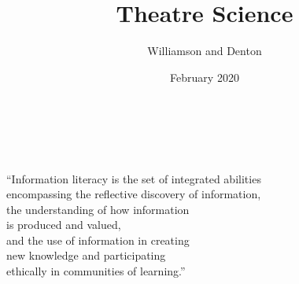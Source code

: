 \documentclass[17pt]{extarticle}
\title{Theatre Science}
\author{Williamson and Denton}
\date{February 2020}
\begin{document}

\vspace*{1in}

{
  \begin{center}


  \vspace{0.5in}


  \vspace{0.5in}


\end{center}

}

\newpage


\vspace*{1in}

{\Huge

\begin{center}

   \\
  \vspace{1in}
   \\
  \vspace{1in}

\end{center}

}

\newpage


{\Huge

  \begin{center}

    ``Information literacy is the set of integrated abilities \\
    [ 0.5\baselineskip ]
    encompassing the reflective discovery of information, \\
    [ 0.5\baselineskip ]
    the understanding of how information \\
    is produced and valued, \\
    [ 0.5\baselineskip ]
    and the use of information in creating \\
    new knowledge and participating \\
    ethically in communities of learning.''

  \end{center}

}
\end{document}
